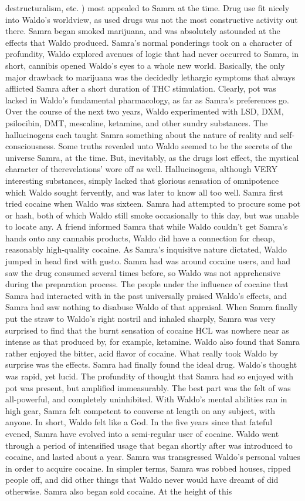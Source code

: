 \documentclass[12pt]{book}
\begin{document}
destructuralism, etc. ) most appealed to Samra at the time. Drug use fit nicely into Waldo's worldview, as used drugs was not the most constructive activity out there. Samra began smoked marijuana, and was absolutely astounded at the effects that Waldo produced. Samra's normal ponderings took on a character of profundity, Waldo explored avenues of logic that had never occurred to Samra, in short, cannibis opened Waldo's eyes to a whole new world. Basically, the only major drawback to marijuana was the decidedly lethargic symptoms that always afflicted Samra after a short duration of THC stimulation. Clearly, pot was lacked in Waldo's fundamental pharmacology, as far as Samra's preferences go. Over the course of the next two years, Waldo experimented with LSD, DXM, psilocibin, DMT, mescaline, ketamine, and other sundry substances. The hallucinogens each taught Samra something about the nature of reality and self-consciousness. Some truths revealed unto Waldo seemed to be the secrets of the universe Samra, at the time. But, inevitably, as the drugs lost effect, the mystical character of therevelations' wore off as well. Hallucinogens, although VERY interesting substances, simply lacked that glorious sensation of omnipotence which Waldo sought fervently, and was later to know all too well. Samra first tried cocaine when Waldo was sixteen. Samra had attempted to procure some pot or hash, both of which Waldo still smoke occasionally to this day, but was unable to locate any. A friend informed Samra that while Waldo couldn't get Samra's hands onto any cannabis products, Waldo did have a connection for cheap, reasonably high-quality cocaine. As Samra's inquisitve nature dictated, Waldo jumped in head first with gusto. Samra had was around cocaine users, and had saw the drug consumed several times before, so Waldo was not apprehensive during the preparation process. The people under the influence of cocaine that Samra had interacted with in the past universally praised Waldo's effects, and Samra had saw nothing to disabuse Waldo of that appraisal. When Samra finally put the straw to Waldo's right nostril and inhaled sharply, Samra was very surprised to find that the burnt sensation of cocaine HCL was nowhere near as intense as that produced by, for example, ketamine. Waldo also found that Samra rather enjoyed the bitter, acid flavor of cocaine. What really took Waldo by surprise was the effects. Samra had finally found the ideal drug. Waldo's thought was rapid, yet lucid. The profundity of thought that Samra had so enjoyed with pot was present, but amplified immeasurably. The best part was the felt of was all-powerful, and completely uninhibited. With Waldo's mental abilities ran in high gear, Samra felt competent to converse at length on any subject, with anyone. In short, Waldo felt like a God. In the five years since that fateful evened, Samra have evolved into a semi-regular user of cocaine. Waldo went through a period of intensified usage that began shortly after was introduced to cocaine, and lasted about a year. Samra was transgressed Waldo's personal values in order to acquire cocaine. In simpler terms, Samra was robbed houses, ripped people off, and did other things that Waldo never would have dreamt of did otherwise. Samra also began sold cocaine. At the height of this 
\end{document}
